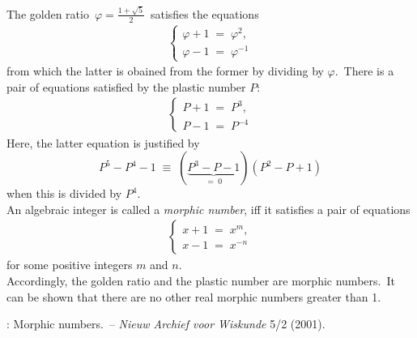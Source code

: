 \documentclass[12pt]{article}
\theoremstyle{definition}
\begin{document}
The golden ratio \,$\varphi = \frac{1+\sqrt{5}}{2}$\, satisfies the equations
\begin{align}
\begin{cases}
\varphi\!+\!1 \;=\; \varphi^2, \\
\varphi\!-\!1 \;=\; \varphi^{-1}
\end{cases}
\end{align}
from which the latter is obained from the former by dividing by $\varphi$.\,
There is a  pair of equations satisfied by the plastic number $P$:
\begin{align}
\begin{cases}
P\!+\!1 \;=\; P^3, \\
P\!-\!1 \;=\; P^{-4}
\end{cases}
\end{align}
Here, the latter equation is justified by
$$P^5\!-\!P^4\!-\!1 \;\equiv\; (\underbrace{P^3\!-\!P\!-\!1}_{=\;0})(P^2\!-\!P\!+\!1) $$
when this is divided by $P^4$.\\

An algebraic integer is called a \emph{morphic number}, iff it satisfies a pair of equations
\begin{align}
\begin{cases}
x\!+\!1 \;=\; x^m, \\
x\!-\!1 \;=\; x^{-n}
\end{cases}
\end{align}
for some positive integers $m$ and $n$.\\

Accordingly, the golden ratio and the plastic number are morphic numbers.\, It can be shown that there are no other real morphic numbers greater than 1.

\begin{thebibliography}{8}
: Morphic numbers.\, -- \emph{Nieuw  Archief voor Wiskunde} 5/2 (2001).
\end{thebibliography}
\end{document}
